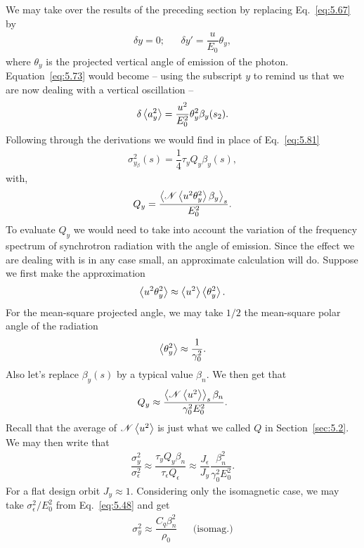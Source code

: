 We may take over the results of the preceding section by replacing Eq.~\eqref{eq:5.67} by
\begin{align}
	\delta y = 0; && \delta y' = \dfrac{u}{E_0} \theta_y,
\end{align}
where $\theta_y$ is the projected vertical angle of emission of the photon. Equation~\eqref{eq:5.73} would become -- using the subscript $y$ to remind us that we are now dealing with a vertical oscillation --
\begin{align}
	\delta\left< a_y^2 \right> = \dfrac{u^2}{E_0^2} \theta_y^2 \beta_y (s_2).
\end{align}
Following through the derivations we would find in place of Eq.~\eqref{eq:5.81}
\begin{align}
	\sigma_{y_\beta}^2(s) = \dfrac{1}{4} \tau_y Q_y \beta_y(s),
\end{align}
with,
\begin{align}
	Q_y = \dfrac{\left< \mathscr{N}\left< u^2 \theta_y^2 \right>\beta_y \right>_s}{E_0^2}.
\end{align}
To evaluate $Q_y$ we would need to take into account the variation of the frequency spectrum of synchrotron radiation with the angle of emission. Since the effect we are dealing with is in any case small, an approximate calculation will do. Suppose we first make the approximation
\begin{align}
	\left< u^2 \theta_y^2 \right> \approx \left< u^2 \right>\left< \theta_y^2 \right>.
\end{align}
For the mean-square projected angle, we may take $1/2$ the mean-square polar angle of the radiation
\begin{align}
	\left< \theta_y^2 \right> \approx \dfrac{1}{\gamma_0^2}.
\end{align}
Also let's replace $\beta_y(s)$ by a typical value $\beta_n$. We then get that
\begin{align}
	Q_y \approx \dfrac{\left< \mathscr{N}\left< u^2 \right> \right>_s\beta_n}{\gamma_0^2 E_0^2}.
\end{align}
Recall that the average of $\mathscr{N}\left< u^2 \right>$ is just what we called $Q$ in Section~\ref{sec:5.2}. We may then write that
\begin{align}
	\dfrac{\sigma_y^2}{\sigma_\epsilon^2} \approx \dfrac{\tau_y Q_y \beta_n}{\tau_\epsilon Q_\epsilon} \approx \dfrac{J_\epsilon}{J_y} \dfrac{\beta_n^2}{\gamma_0^2 E_0^2}.
\end{align}
For a flat design orbit $J_y \approx 1$. Considering only the isomagnetic case, we may take $\sigma_\epsilon^2/E_0^2$ from Eq.~\eqref{eq:5.48} and get
\begin{align} \label{eq:5.107}
	\sigma_y^2 \approx \dfrac{C_q \beta_n^2}{\rho_0} && \text{(isomag.)}
\end{align}

